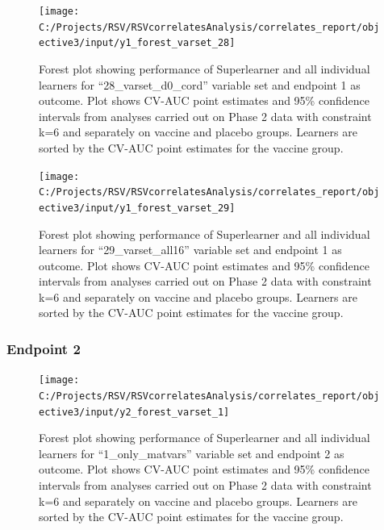 \documentclass[11pt]{article}
\begin{document}
\begin{figure}[H]

{\centering \texttt{[image: C:/Projects/RSV/RSVcorrelatesAnalysis/correlates\_report/objective3/input/y1\_forest\_varset\_28]} 

}

\caption[Forest plot for ``28\_varset\_d0\_cord'' variable set, endpoint 1.]{Forest plot showing performance of Superlearner and all individual learners for ``28\_varset\_d0\_cord'' variable set and endpoint 1 as outcome. Plot shows CV-AUC point estimates and 95\% confidence intervals from analyses carried out on Phase 2 data with constraint k=6 and separately on vaccine and placebo groups. Learners are sorted by the CV-AUC point estimates for the vaccine group.}\label{fig:y1-forest-varset-28}
\end{figure}

\begin{figure}[H]

{\centering \texttt{[image: C:/Projects/RSV/RSVcorrelatesAnalysis/correlates\_report/objective3/input/y1\_forest\_varset\_29]} 

}

\caption[Forest plot for ``29\_varset\_all16'' variable set, endpoint 1.]{Forest plot showing performance of Superlearner and all individual learners for ``29\_varset\_all16'' variable set and endpoint 1 as outcome. Plot shows CV-AUC point estimates and 95\% confidence intervals from analyses carried out on Phase 2 data with constraint k=6 and separately on vaccine and placebo groups. Learners are sorted by the CV-AUC point estimates for the vaccine group.}\label{fig:y1-forest-varset-29}
\end{figure}

\hypertarget{endpoint-2}{%
\subsubsection{Endpoint 2}\label{endpoint-2}}

\begin{figure}[H]

{\centering \texttt{[image: C:/Projects/RSV/RSVcorrelatesAnalysis/correlates\_report/objective3/input/y2\_forest\_varset\_1]} 

}

\caption[Forest plot for ``1\_only\_matvars'' variable set, endpoint 2.]{Forest plot showing performance of Superlearner and all individual learners for ``1\_only\_matvars'' variable set and endpoint 2 as outcome. Plot shows CV-AUC point estimates and 95\% confidence intervals from analyses carried out on Phase 2 data with constraint k=6 and separately on vaccine and placebo groups. Learners are sorted by the CV-AUC point estimates for the vaccine group.}\label{fig:y2-forest-varset-1}
\end{figure}
\end{document}
